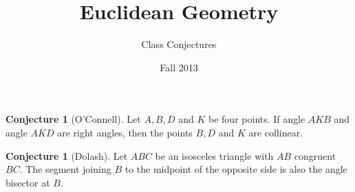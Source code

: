\documentclass{tufte-handout}
\title{Euclidean Geometry}
\author[]{Class Conjectures}
\date{Fall 2013}
\theoremstyle{definition}
\newtheorem{conjecture}[problem]{Conjecture}
\begin{document}
\maketitle

\renewcommand{\theproblem}{\Alph{problem}}

\begin{conjecture}[O'Connell]
Let $A, B, D$ and $K$ be four points.
If angle $AKB$ and angle $AKD$ are right angles, then the points $B, D$ and $K$ are collinear.
\end{conjecture}

\begin{conjecture}[Dolash]
Let $ABC$ be an isosceles triangle with $AB$ congruent $BC$.
The segment joining $B$ to the midpoint of the opposite side is also the angle bisector at $B$.
\end{conjecture}
\end{document}
